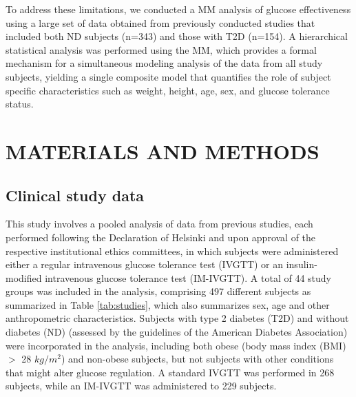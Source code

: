 \documentclass[utf8]{frontiersSCNS} %
\begin{document}
To address these limitations, we conducted a MM analysis of glucose effectiveness using a large set of data obtained from previously conducted studies that included both ND subjects (n=343) and those with T2D (n=154). A hierarchical statistical analysis was performed using the MM, which provides a formal mechanism for a simultaneous modeling analysis of the data from all study subjects, yielding a single composite model that quantifies the role of subject specific characteristics such as weight, height, age, sex, and glucose tolerance status.

\vskip 0.5cm
\section{MATERIALS AND METHODS}
\vskip 0.5cm
\subsection{Clinical study data}
This study involves a pooled analysis of data from previous studies, each performed following the Declaration of Helsinki and upon approval of the respective institutional ethics committees, in which subjects were administered either a regular intravenous glucose tolerance test (IVGTT) or an insulin-modified intravenous glucose tolerance test (IM-IVGTT). A total of 44 study groups was included in the analysis, comprising 497 different subjects as summarized in Table \ref{tab:studies}, which also summarizes sex, age and other anthropometric characteristics. Subjects with type 2 diabetes (T2D) and without diabetes (ND) (assessed by the guidelines of the American Diabetes Association) were incorporated in the analysis, including both obese (body mass index (BMI) $>$ 28 $kg/m^2$) and non-obese subjects, but not subjects with other conditions that might alter glucose regulation. A standard IVGTT was performed in 268 subjects, while an IM-IVGTT was administered to 229 subjects. 
\end{document}
